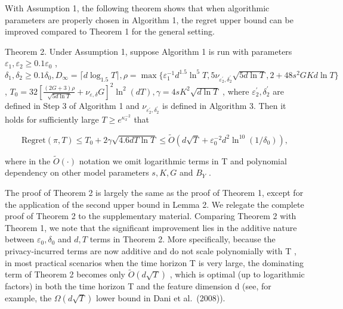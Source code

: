 With Assumption 1, the following theorem shows that when algorithmic parameters are properly chosen in Algorithm 1, the regret upper bound can be improved compared to Theorem 1 for the general setting.

Theorem 2. Under Assumption 1, suppose Algorithm 1 is run with parameters \(\varepsilon _ { 1 } , \varepsilon _ { 2 } \geq 0 . 1 \varepsilon _ { 0 }\) , \(\delta _ { 1 } , \delta _ { 2 } \geq 0 . 1 \delta _ { 0 } , D _ { \infty } = \lceil d \log _ { 1 . 5 } T \rceil , \rho = \operatorname* { m a x } \{ \varepsilon _ { 1 } ^ { - 1 } d ^ { 1 . 5 } \ln ^ { 5 } T , 5 \nu _ { \varepsilon _ { 2 } ^ { \prime } , \delta _ { 2 } ^ { \prime } } \sqrt { 5 d \ln T } , 2 + 4 8 s ^ { 2 } G K d \ln T \}\) , \(T _ { 0 } = 3 2 [ \frac { ( 2 G + 3 ) \rho } { \sqrt { 5 d \ln T } } + \nu _ { \varepsilon , \delta } G ] ^ { 2 } \ln ^ { 2 } ( d T ) , \gamma = 4 s K ^ { 2 } \sqrt { d \ln T }\) , where \(\varepsilon _ { 2 } ^ { \prime } , \delta _ { 2 } ^ { \prime }\) are defined in Step 3 of Algorithm 1 and \(\nu _ { \varepsilon _ { 2 } ^ { \prime } , \delta _ { 2 } ^ { \prime } }\) is defined in Algorithm 3. Then it holds for sufficiently large \(T \geq e ^ { \kappa _ { x } ^ { - 2 } }\) that

\[
\mathrm{Regret} (\pi , T) \leq T _ {0} + 2 \gamma \sqrt {4 . 6 d T \ln T} \leq \widetilde {O} \left(d \sqrt {T} + \varepsilon_ {0} ^ {- 2} d ^ {2} \ln^ {1 0} (1 / \delta_ {0})\right),
\]

where in the \({ \widetilde { O } } ( \cdot )\) notation we omit logarithmic terms in T and polynomial dependency on other model parameters \(s , K , G\) and \(B _ { Y }\) .

The proof of Theorem 2 is largely the same as the proof of Theorem 1, except for the application of the second upper bound in Lemma 2. We relegate the complete proof of Theorem 2 to the supplementary material. Comparing Theorem 2 with Theorem 1, we note that the significant improvement lies in the additive nature between \(\varepsilon _ { 0 } , \delta _ { 0 }\) and \(d , T\) terms in Theorem 2. More specifically, because the privacy-incurred terms are now additive and do not scale polynomially with T , in most practical scenarios when the time horizon T is very large, the dominating term of Theorem 2 becomes only \(\widetilde { O } ( d \sqrt { T } )\) , which is optimal (up to logarithmic factors) in both the time horizon T and the feature dimension d (see, for example, the \(\Omega ( d \sqrt { T } )\) lower bound in Dani et al.~(2008)).

